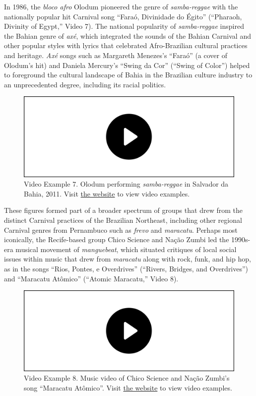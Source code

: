 \documentclass[twoside]{article}
\providecommand{\wmturlcaption}{
  Visit \href{https://worldmusictextbook.org/mcnally-2021}{the website} to view video examples.
}
\begin{document}
In 1986, the \emph{bloco afro} Olodum pioneered the genre of
\emph{samba-reggae} with the nationally popular hit Carnival song
``Faraó, Divinidade do Égito'' (``Pharaoh, Divinity of Egypt,'' Video
7). The national popularity of \emph{samba-reggae} inspired the Bahian
genre of \emph{axé}, which integrated the sounds of the Bahian Carnival
and other popular styles with lyrics that celebrated Afro-Brazilian
cultural practices and heritage. \emph{Axé} songs such as Margareth
Menezes's ``Faraó'' (a cover of Olodum's hit) and Daniela Mercury's
``Swing da Cor'' (``Swing of Color'') helped to foreground the cultural
landscape of Bahia in the Brazilian culture industry to an unprecedented
degree, including its racial politics.

\begin{figure}
  \includegraphics[width=\textwidth]{../play-video.png}
  \caption*{Video Example 7. Olodum performing \emph{samba-reggae} in Salvador da Bahia, 2011. \wmturlcaption}
\end{figure}

These figures formed part of a broader spectrum of groups that drew from
the distinct Carnival practices of the Brazilian Northeast, including
other regional Carnival genres from Pernambuco such as \emph{frevo} and
\emph{maracatu}. Perhaps most iconically, the Recife-based group Chico
Science and Nação Zumbi led the 1990s-era musical movement of
\emph{manguebeat}, which situated critiques of local social issues
within music that drew from \emph{maracatu} along with rock, funk, and
hip hop, as in the songs ``Rios, Pontes, e Overdrives'' (``Rivers,
Bridges, and Overdrives'') and ``Maracatu Atômico'' (``Atomic
Maracatu,'' Video 8).

\begin{figure}
  \includegraphics[width=\textwidth]{../play-video.png}
  \caption*{Video Example 8. Music video of Chico Science and Nação Zumbi's song
  ``Maracatu Atômico''. \wmturlcaption}
\end{figure}
\end{document}
